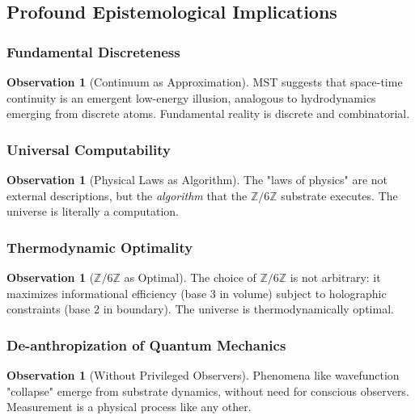 \documentclass[11pt, a4paper]{article}
\theoremstyle{plain}
\theoremstyle{definition}
\newtheorem{observation}[theorem]{Observation}
\newcommand{\Zmod}{\mathbb{Z}/6\mathbb{Z}}
\begin{document}
\subsection{Profound Epistemological Implications}

\subsubsection{Fundamental Discreteness}
\begin{observation}[Continuum as Approximation]
MST suggests that space-time continuity is an emergent low-energy illusion, analogous to hydrodynamics emerging from discrete atoms. Fundamental reality is discrete and combinatorial.
\end{observation}

\subsubsection{Universal Computability}
\begin{observation}[Physical Laws as Algorithm]
The "laws of physics" are not external descriptions, but the \textit{algorithm} that the $\Zmod$ substrate executes. The universe is literally a computation.
\end{observation}

\subsubsection{Thermodynamic Optimality}
\begin{observation}[$\Zmod$ as Optimal]
The choice of $\Zmod$ is not arbitrary: it maximizes informational efficiency (base 3 in volume) subject to holographic constraints (base 2 in boundary). The universe is thermodynamically optimal.
\end{observation}

\subsubsection{De-anthropization of Quantum Mechanics}
\begin{observation}[Without Privileged Observers]
Phenomena like wavefunction "collapse" emerge from substrate dynamics, without need for conscious observers. Measurement is a physical process like any other.
\end{observation}

\end{document}
